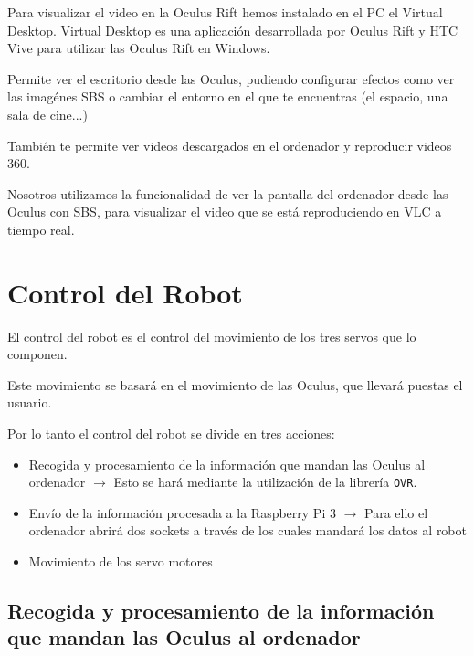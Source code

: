\documentclass[twoside, 11pt]{epstfg}
\begin{document}
Para visualizar el video en la Oculus Rift hemos instalado en el PC el  Virtual Desktop. Virtual Desktop es una aplicación desarrollada por Oculus Rift y  HTC Vive para utilizar las Oculus Rift en Windows.

Permite ver el escritorio desde las Oculus, pudiendo configurar efectos como ver las imagénes SBS o cambiar el entorno en el que te encuentras (el espacio, una sala de cine...)



También te permite ver videos descargados en el ordenador y reproducir videos 360.

Nosotros utilizamos la funcionalidad de ver la pantalla del ordenador desde las Oculus con SBS, para visualizar el video que se está reproduciendo en VLC a tiempo real.



\newpage

\section{Control del Robot}
El control del robot es el control del movimiento de los tres servos que lo componen. 

Este movimiento se basará en el movimiento de las Oculus, que llevará puestas el usuario.

Por lo tanto el control del robot se divide en tres acciones:
\begin{itemize}
	\item Recogida y procesamiento de la información que mandan las Oculus al ordenador $\rightarrow$ Esto se hará mediante la utilización de la librería \texttt{OVR}.
	
	\item Envío de la información procesada a la Raspberry Pi 3 $\rightarrow$ Para ello el ordenador abrirá dos sockets a través de los cuales mandará los datos al robot
	
	\item Movimiento de los servo motores
\end{itemize}
\subsection{Recogida y procesamiento de la información que mandan las Oculus al ordenador}
\end{document}
